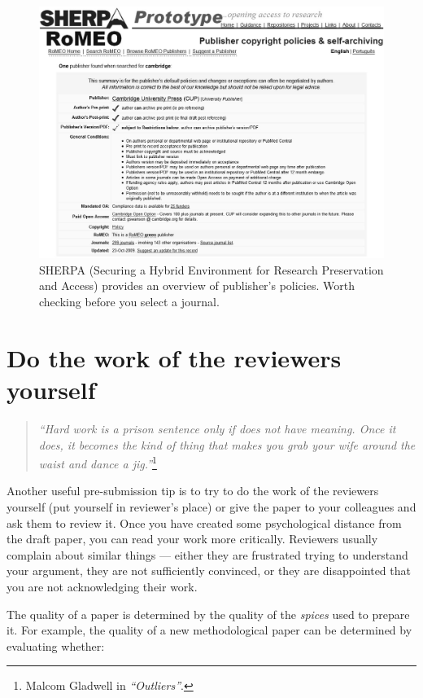 \documentclass[graybox,envcountchap,sectrefs,UStrade]{svmono}
\begin{document}
\begin{figure}
\begin{center}
 \includegraphics[width=.75\textwidth]{Fig_SHERPA_screen.jpg}
\caption{SHERPA (Securing a Hybrid Environment for Research Preservation and Access) provides an overview of publisher's policies. Worth checking before you select a journal.}
\label{Fig:SHERPA_screen}
\end{center}
\end{figure}



 \section{Do the work of the reviewers yourself}

\begin{quote}
    \emph{``Hard work is a prison sentence only if does not have meaning. Once it does, it becomes the kind of thing that makes you grab your wife around the waist and dance a jig.''}\footnote{Malcom Gladwell in \emph{``Outliers''}.}
\end{quote}

Another useful pre-submission tip is to try to do the work of the reviewers yourself (put yourself in reviewer's place) or give the paper to your colleagues and ask them to review it. Once you have created some psychological distance from the draft paper, you can read your work more critically. Reviewers usually complain about similar things --- either they are frustrated trying to understand your argument, they are not sufficiently convinced, or they are disappointed that you are not acknowledging their work.\par

The quality of a paper is determined by the quality of the \emph{spices} used to prepare it. For example, the quality of a new methodological paper can be determined by evaluating whether:
\end{document}
